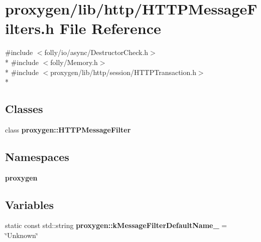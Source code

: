 \section{proxygen/lib/http/\+H\+T\+T\+P\+Message\+Filters.h File Reference}
\label{HTTPMessageFilters_8h}
{\ttfamily \#include $<$folly/io/async/\+Destructor\+Check.\+h$>$}\\*
{\ttfamily \#include $<$folly/\+Memory.\+h$>$}\\*
{\ttfamily \#include $<$proxygen/lib/http/session/\+H\+T\+T\+P\+Transaction.\+h$>$}\\*
\subsection*{Classes}
\begin{DoxyCompactItemize}
\item 
class {\bf proxygen\+::\+H\+T\+T\+P\+Message\+Filter}
\end{DoxyCompactItemize}
\subsection*{Namespaces}
\begin{DoxyCompactItemize}
\item 
 {\bf proxygen}
\end{DoxyCompactItemize}
\subsection*{Variables}
\begin{DoxyCompactItemize}
\item 
static const std\+::string {\bf proxygen\+::k\+Message\+Filter\+Default\+Name\+\_\+} = \char`\"{}Unknown\char`\"{}
\end{DoxyCompactItemize}
